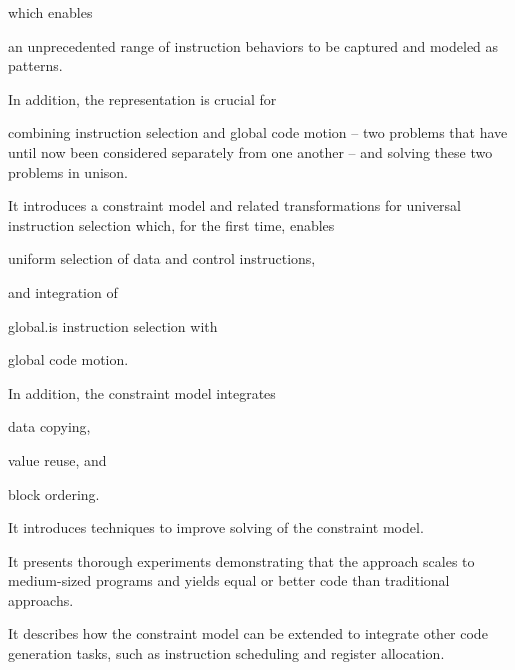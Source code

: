 \begin{contributions}
\begin{contributions}
    \end{contributions}
    which enables
    \begin{contributions}[resume]
      \item {}
        an unprecedented range of instruction behaviors to be captured and
        modeled as \glspl{pattern}.
    \end{contributions}
    In addition, the representation is crucial for
    \begin{contributions}[resume]
      \item {}
        combining \gls{instruction selection} and \gls{global code motion} --
        two problems that have until now been considered separately from one
        another -- and solving these two problems in unison.
    \end{contributions}
  \item {}
    It introduces a \gls{constraint model} and related transformations for
    \gls{universal instruction selection} which, for the first time, enables
    \begin{contributions}
      \item {}
        uniform selection of data and control \glspl{instruction},
    \end{contributions}
    and integration of
    \begin{contributions}[resume]
      \item {}
        \gls{global.is} \gls{instruction selection} with
      \item {}
        \gls{global code motion}.
    \end{contributions}
    In addition, the \gls{constraint model} integrates
    \begin{contributions}[resume]
      \item {}
        \gls{data copying},
      \item {}
        \gls{value reuse}, and
      \item {}
        \gls{block ordering}.
    \end{contributions}
  \item {}
    It introduces techniques to improve solving of the \gls{constraint model}.
  \item {}
    It presents thorough experiments demonstrating that the approach scales to
    medium-sized \glspl{program} and yields equal or better code than
    \glspl{traditional approach}.
  \item {}
    It describes how the \gls{constraint model} can be extended to integrate
    other \gls{code generation} tasks, such as \gls{instruction scheduling} and
    \gls{register allocation}.
\end{contributions}

